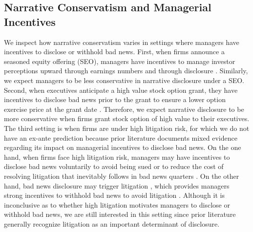\documentclass[letterpaper,12pt]{article}
\begin{document}
\begin{spacing}{1.5}
\subsection{Narrative Conservatism and Managerial Incentives}
\noindent We inspect how narrative conservatism varies in settings where managers have incentives to disclose or withhold bad news. First, when firms announce a seasoned equity offering (SEO), managers have incentives to manage investor perceptions upward through earnings numbers \cite{teohEarningsManagementUnderperformance1998} and through disclosure \cite{langVoluntaryDisclosureEquity2000}. Similarly, we expect managers to be less conservative in narrative disclosure under a SEO. Second, when executives anticipate a high value stock option grant, they have incentives to disclose bad news prior to the grant to ensure a lower option exercise price at the grant date \cite{aboodyCEOStockOption2000,bakerStockOptionCompensation2003,mcanallyExecutiveStockOptions2008}. Therefore, we expect narrative disclosure to be more conservative when firms grant stock option of high value to their executives. The third setting is when firms are under high litigation risk, for which we do not have an ex-ante prediction because prior literature documents mixed evidence regarding its impact on managerial incentives to disclose bad news. On the one hand, when firms face high litigation risk, managers may have incentives to disclose bad news voluntarily to avoid being sued or to reduce the cost of resolving litigation that inevitably follows in bad news quarters \cite{skinnerWhyFirmsVoluntarily1994, skinnerEarningsDisclosuresStockholder1997}. On the other hand, bad news disclosure may trigger litigation \cite{francisShareholderLitigationCorporate1994}, which provides managers strong incentives to withhold bad news to avoid litigation \cite{rogersShareholderLitigationChanges2009}. Although it is inconclusive as to whether high litigation motivates managers to disclose or withhold bad news, we are still interested in this setting since prior literature generally recognize litigation as an important determinant of disclosure.


\end{spacing}
\end{document}
